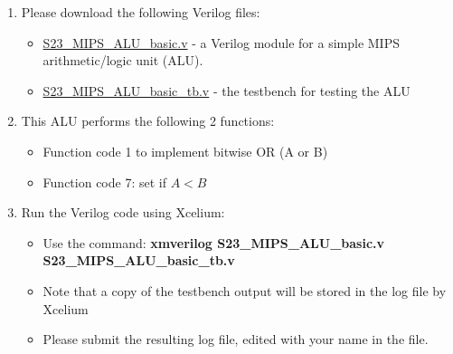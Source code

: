 \documentclass[12pt]{article}
\begin{document}
    \begin{enumerate}
        \item Please download the following Verilog files:
        \begin{itemize}
            \item \href{https://smu.instructure.com/courses/106177/files/7251184?wrap=1}{S23\_MIPS\_ALU\_basic.v} - a Verilog module for a simple MIPS arithmetic/logic unit (ALU).
            \item \href{https://smu.instructure.com/courses/106177/files/7251189?wrap=1}{S23\_MIPS\_ALU\_basic\_tb.v} - the testbench for testing the ALU
        \end{itemize}
        \item This ALU performs the following 2 functions:
        \begin{itemize}
            \item Function code 1 to implement bitwise OR (A or B)
            \item Function code 7: set if $A < B$
        \end{itemize}
        \item Run the Verilog code using Xcelium:
        \begin{itemize}
            \item Use the command: \textbf{xmverilog S23\_MIPS\_ALU\_basic.v S23\_MIPS\_ALU\_basic\_tb.v}
            \item Note that a copy of the testbench output will be stored in the log file by Xcelium
            \item Please submit the resulting log file, edited with your name in the file.
        \end{itemize}
    \end{enumerate}
\end{document}
